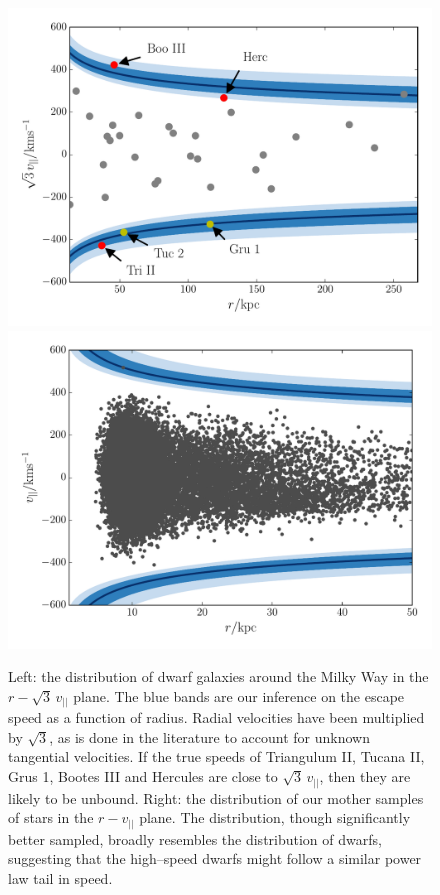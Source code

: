 \documentclass[useAMS,twocolumn,usenatbib]{mn2e}
\def\vlos{{v_{||}}}
\begin{document}
\begin{figure}
\includegraphics[width=\columnwidth]{plots/sats}\hfill 
\includegraphics[width=\columnwidth]{plots/stars_bound}\\
\caption{Left: the distribution of dwarf galaxies around the Milky Way 
in the $r-\sqrt{3}\,\vlos$ plane. The blue bands are our inference on 
the escape speed as a function of radius. Radial velocities have been multiplied 
by $\sqrt{3}$, as is done in the literature to account for unknown 
tangential velocities. If the true speeds of Triangulum II, Tucana II, 
Grus 1, Bootes III and Hercules are close to $\sqrt{3}\,\vlos$, then they are 
likely to be unbound. Right: the distribution of our mother samples of stars 
in the $r-\vlos$ plane. The distribution, though significantly better sampled, 
broadly resembles the distribution of dwarfs, suggesting that the high--speed 
dwarfs might follow a similar power law tail in speed.}
\label{fig:sats}
\end{figure}
\end{document}
